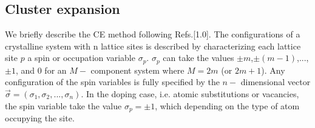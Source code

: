 \documentclass[aps,preprint,amsmath,amssymb]{revtex4}
\newcommand{\mycite}[1]{\scalebox{1.0}[1.0]{\raisebox{0.1ex}{\cite{#1}}}}
\begin{document}
\subsection{Cluster expansion}
We briefly describe the CE method following Refs.\mycite{Sanchez1984,Wolverton1993,Wolverton1994,Zunger2002}.
The configurations of a crystalline system with n lattice sites is described by
characterizing each lattice site $p$ a spin or occupation variable $\sigma_{p}$.
$\sigma_{p}$ can take the values $\pm m$,$\pm(m-1)$,$...$,$\pm1$, and
0 for an $M-$ component system where $M=2m$ (or $2m+1$).
Any configuration of the spin variables is fully specified by
the $n-$ dimensional vector $\vec{\sigma}=({\sigma_{1},\sigma_{2},...,\sigma_{n}})$.
In the doping case, i.e. atomic substitutions or vacancies,
the spin variable take the value $\sigma_{p}=\pm1$, which depending on the type of atom
occupying the site.
\end{document}
